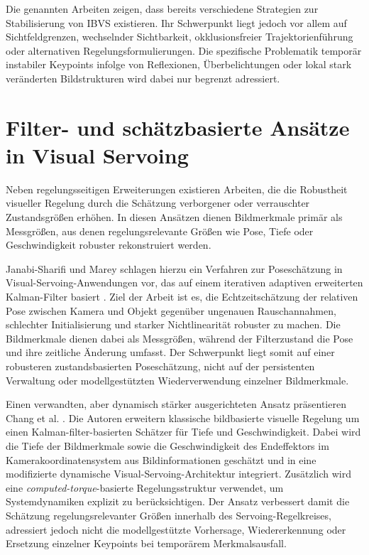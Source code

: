 Die genannten Arbeiten zeigen, dass bereits verschiedene Strategien zur Stabilisierung von \ac{IBVS} existieren. Ihr Schwerpunkt liegt jedoch vor allem auf Sichtfeldgrenzen, wechselnder Sichtbarkeit, okklusionsfreier Trajektorienführung oder alternativen Regelungsformulierungen. Die spezifische Problematik temporär instabiler Keypoints infolge von Reflexionen, Überbelichtungen oder lokal stark veränderten Bildstrukturen wird dabei nur begrenzt adressiert.

\section{Filter- und schätzbasierte Ansätze in Visual Servoing}
\label{sec:filter_estimation_related}

Neben regelungsseitigen Erweiterungen existieren Arbeiten, die die Robustheit visueller Regelung durch die Schätzung verborgener oder verrauschter Zustandsgrößen erhöhen. In diesen Ansätzen dienen Bildmerkmale primär als Messgrößen, aus denen regelungsrelevante Größen wie Pose, Tiefe oder Geschwindigkeit robuster rekonstruiert werden.

Janabi-Sharifi und Marey schlagen hierzu ein Verfahren zur Poseschätzung in Visual-Servoing-Anwendungen vor, das auf einem iterativen adaptiven erweiterten Kalman-Filter basiert \cite{janabi2010kalman}. Ziel der Arbeit ist es, die Echtzeitschätzung der relativen Pose zwischen Kamera und Objekt gegenüber ungenauen Rauschannahmen, schlechter Initialisierung und starker Nichtlinearität robuster zu machen. Die Bildmerkmale dienen dabei als Messgrößen, während der Filterzustand die Pose und ihre zeitliche Änderung umfasst. Der Schwerpunkt liegt somit auf einer robusteren zustandsbasierten Poseschätzung, nicht auf der persistenten Verwaltung oder modellgestützten Wiederverwendung einzelner Bildmerkmale.

Einen verwandten, aber dynamisch stärker ausgerichteten Ansatz präsentieren Chang et al. \cite{chang2021dynamic}. Die Autoren erweitern klassische bildbasierte visuelle Regelung um einen Kalman-filter-basierten Schätzer für Tiefe und Geschwindigkeit. Dabei wird die Tiefe der Bildmerkmale sowie die Geschwindigkeit des Endeffektors im Kamerakoordinatensystem aus Bildinformationen geschätzt und in eine modifizierte dynamische Visual-Servoing-Architektur integriert. Zusätzlich wird eine \textit{computed-torque}-basierte Regelungsstruktur verwendet, um Systemdynamiken explizit zu berücksichtigen. Der Ansatz verbessert damit die Schätzung regelungsrelevanter Größen innerhalb des Servoing-Regelkreises, adressiert jedoch nicht die modellgestützte Vorhersage, Wiedererkennung oder Ersetzung einzelner Keypoints bei temporärem Merkmalsausfall.

